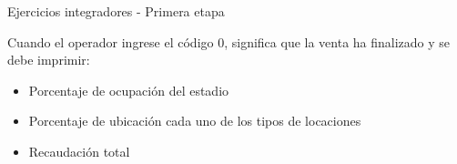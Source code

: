 \documentclass[xcolor=pdftex,table,11pt]{beamer}
\begin{document}
\begin{frame}[allowframebreaks]{Ejercicios integradores - Primera etapa}
\begin{enumerate}
\newpage
Cuando el operador ingrese el código 0, significa que la venta ha finalizado y se debe imprimir:
\begin{itemize}
\item Porcentaje de ocupación del estadio
\item Porcentaje de ubicación cada uno de los tipos de locaciones
\item Recaudación total

\end{itemize}
\href{https://github.com/danis963/informaticaI_IUA/blob/main/c/src/6-integrador_3.c}{}

\end{enumerate}




 
\end{frame}
\end{document}
